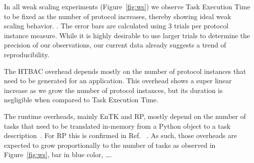 
In all weak scaling experiments (Figure~\ref{fig:ws}) we
observe Task Execution Time to be fixed as the number of protocol increases, 
thereby showing ideal weak scaling behavior. .
 The error bars are calculated
using 3 trials per protocol instance measure. While it is highly desirable to use 
larger trials to determine the precision of our observations, our current data
already suggests a trend of reproducibility. 

The HTBAC overhead depends mostly on the number of protocol instances that
need to be generated for an application. This overhead shows a super linear
increase as we grow the number of protocol instances, but its duration is
negligible when compared to Task Execution Time.


The runtime overheads, mainly EnTK and RP, mostly depend on the number of
tasks that need to be translated in-memory from a Python object to a
task description~\cite{dakka2017}. For RP this is confirmed in 
Ref.~\cite{merzky2018} 
.
As such, those overheads are expected to grow proportionally to
the number of tasks as observed in Figure~\ref{fig:ws}, bar in blue color, \ldots.


